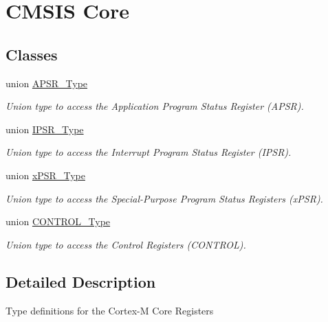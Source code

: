 \hypertarget{group___c_m_s_i_s___c_o_r_e}{\section{C\-M\-S\-I\-S Core}
\label{group___c_m_s_i_s___c_o_r_e}
}
\subsection*{Classes}
\begin{DoxyCompactItemize}
\item 
union \hyperlink{union_a_p_s_r___type}{A\-P\-S\-R\-\_\-\-Type}
\begin{DoxyCompactList}\small\item\em Union type to access the Application Program Status Register (A\-P\-S\-R). \end{DoxyCompactList}\item 
union \hyperlink{union_i_p_s_r___type}{I\-P\-S\-R\-\_\-\-Type}
\begin{DoxyCompactList}\small\item\em Union type to access the Interrupt Program Status Register (I\-P\-S\-R). \end{DoxyCompactList}\item 
union \hyperlink{unionx_p_s_r___type}{x\-P\-S\-R\-\_\-\-Type}
\begin{DoxyCompactList}\small\item\em Union type to access the Special-\/\-Purpose Program Status Registers (x\-P\-S\-R). \end{DoxyCompactList}\item 
union \hyperlink{union_c_o_n_t_r_o_l___type}{C\-O\-N\-T\-R\-O\-L\-\_\-\-Type}
\begin{DoxyCompactList}\small\item\em Union type to access the Control Registers (C\-O\-N\-T\-R\-O\-L). \end{DoxyCompactList}\end{DoxyCompactItemize}


\subsection{Detailed Description}
Type definitions for the Cortex-\/\-M Core Registers 